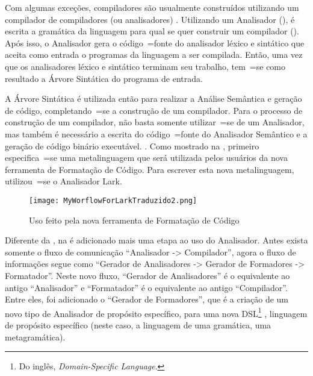 Com algumas exceções,
compiladores são usualmente construídos utilizando um compilador de compiladores (ou analisadores) \cite{compilersCompilerMetaLanguage}.
Utilizando um Analisador (),
é escrita a gramática da linguagem para qual se quer construir um compilador ().
Após isso,
o Analisador gera o código~=fonte do analisador léxico e
sintático que aceita como entrada o programas da linguagem a ser compilada.
Então,
uma vez que os analisadores léxico e
sintático terminam seu trabalho,
tem~=se como resultado a Árvore Sintática do programa de entrada.

A Árvore Sintática é utilizada então para realizar a Análise Semântica e
geração de código,
completando~=se a construção de um compilador.
Para o processo de construção de um compilador,
não basta somente utilizar~=se de um Analisador,
mas também é necessário a escrita do código~=fonte do Analisador Semântico e
a geração de código binário executável.
.
Como mostrado na ,
primeiro especifica~=se uma metalinguagem que será utilizada pelos usuários da nova ferramenta de Formatação de Código.
Para escrever esta nova metalinguagem,
utilizou~=se o Analisador Lark.
\begin{figure}[!htb]
\caption{Uso feito pela nova ferramenta de Formatação de Código}
\label{MyWorflowForLarkTraduzido2}
\centering
\texttt{[image: MyWorflowForLarkTraduzido2.png]}
\end{figure}

Diferente da ,
na  é adicionado mais uma etapa ao uso do Analisador.
Antes exista somente o fluxo de comunicação ``Analisador -> Compilador'',
agora o fluxo de informações segue como ``Gerador de Analisadores -> Gerador de Formadores -> Formatador''.
Neste novo fluxo,
``Gerador de Analisadores'' é o equivalente ao antigo ``Analisador'' e
``Formatador'' é o equivalente ao antigo ``Compilador''.
Entre eles,
foi adicionado o ``Gerador de Formadores'',
que é a criação de um novo tipo de Analisador de propósito específico,
para uma nova DSL\footnote{
Do inglês,
\textit{Domain-Specific Language}.
} \cite{areThereDomainSpecificLanguages,yamlSpecificModelChecking},
linguagem de propósito específico (neste caso,
a linguagem de uma gramática,
uma metagramática).

